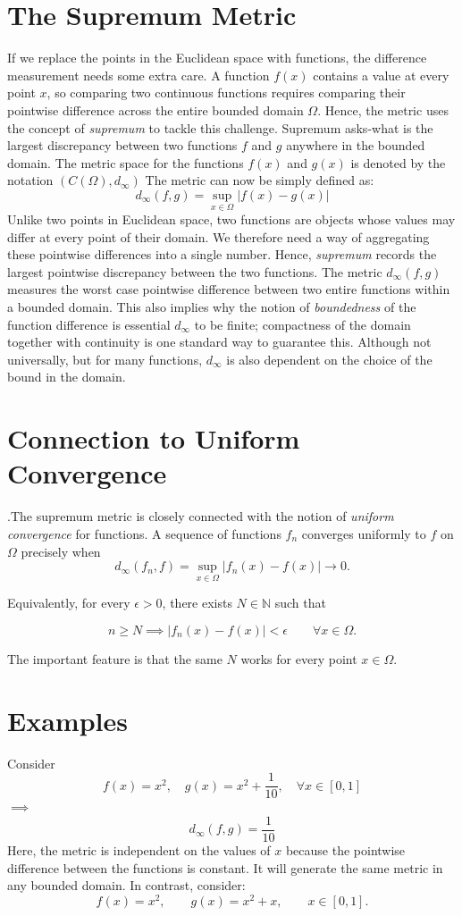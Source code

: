 \documentclass{article}
\begin{document}
\section{The Supremum Metric} If we replace the points in the Euclidean space with functions, the difference measurement needs some extra care. A function $f(x)$ contains a value at every point $x$, so comparing two continuous functions requires comparing their pointwise difference across the entire bounded domain $\Omega$. Hence, the metric uses the concept of \textit{supremum} to tackle this challenge. Supremum asks-what is the largest discrepancy between two functions $f$ and $g$ anywhere in the bounded domain. The metric space for the functions $f(x)$ and $g(x)$ is denoted by the notation $(C(\Omega),d_\infty)$ The metric can now be simply defined as:
\[
d_\infty(f,g)=\sup_{x\in\Omega} |f(x)-g(x)|
\]
Unlike two points in Euclidean space, two functions are objects whose values may differ at every point of their domain. We therefore need a way of aggregating these pointwise differences into a single number. Hence, \textit{supremum} records the largest pointwise discrepancy between the two functions. The metric $d_\infty(f,g)$ measures the worst case pointwise difference between two entire functions within a bounded domain. This also implies why the notion of \textit{boundedness} of the function difference is essential $d_\infty$ to be finite; compactness of the domain together with continuity is one standard way to guarantee this. Although not universally, but for many functions, $d_\infty$ is also dependent on the choice of the bound in the domain.

\section{Connection to Uniform Convergence}.The supremum metric is closely connected with the notion of \textit{uniform convergence} for functions. A sequence of functions $f_n$ converges uniformly to $f$ on $\Omega$ precisely when
\[
d_\infty(f_n,f)
=
\sup_{x\in\Omega}|f_n(x)-f(x)|
\longrightarrow 0.
\]

Equivalently, for every $\epsilon>0$, there exists $N\in\mathbb{N}$ such that

\[
n\geq N
\implies
|f_n(x)-f(x)|<\epsilon
\qquad
\forall x\in\Omega.
\]

The important feature is that the same $N$ works for every point $x\in\Omega$.


\section{Examples}
Consider
\[
f(x)=x^2,\quad g(x)=x^2+\frac{1}{10}, \quad\forall x\in [0,1]
\]
$\implies$
\[
d_\infty(f,g)=\frac{1}{10}
\]
Here, the metric is independent on the values of $x$ because the pointwise difference between the functions is constant. It will generate the same metric in any bounded domain. In contrast, consider:
\[
f(x)=x^2,
\qquad
g(x)=x^2+x,
\qquad x\in[0,1].
\]
\end{document}
